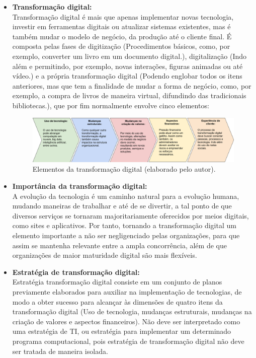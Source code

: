 \begin{itemize}
    \item \textbf{Transformação digital:}\\
    Transformação digital é mais que apenas implementar novas tecnologia, investir em ferramentas digitais ou atualizar sistemas existentes, mas é também mudar o modelo de negócio, da produção até o cliente final. É composta pelas fases de digitização (Procedimentos básicos, como, por exemplo, converter um livro em um documento digital.), digitalização (Indo além e permitindo, por exemplo, novas interações, figuras animadas ou até vídeo.) e a própria transformação digital (Podendo englobar todos os itens anteriores, mas que tem a finalidade de mudar a forma de negócio, como, por exemplo, a compra de livros de maneira virtual, difundindo das tradicionais bibliotecas.), que por fim normalmente envolve cinco elementos:
    
    \begin{figure}[!htpb]
        \centering
        \includegraphics[scale=0.32]{figuras/elementosTD.png}
        \caption{Elementos da transformação digital (elaborado pelo autor).}
        \label{fig:mapETD}
    \end{figure}
    
    \item \textbf{Importância da transformação digital:}\\
    A evolução da tecnologia é um caminho natural para a evolução humana, mudando maneiras de trabalhar e até de se divertir, a tal ponto de que diversos serviços se tornaram majoritariamente oferecidos por meios digitais, como sites e aplicativos. Por tanto, tornando a transformação digital um elemento importante a não ser negligenciado pelas organizações, para que assim se mantenha relevante entre a ampla concorrência, além de que organizações de maior maturidade digital são mais flexíveis.
    
    \item \textbf{Estratégia de transformação digital:}\\
    Estratégia transformação digital consiste em um conjunto de planos previamente elaborados para auxiliar na implementação de tecnologias, de modo a obter sucesso para alcançar às dimensões de quatro itens da transformação digital (Uso de tecnologia, mudanças estruturais, mudanças na criação de valores e aspectos financeiros). Não deve ser interpretado como uma estratégia de TI, ou estratégia para implementar um determinado programa computacional, pois estratégia de transformação digital não deve ser tratada de maneira isolada.
    

\end{itemize}
